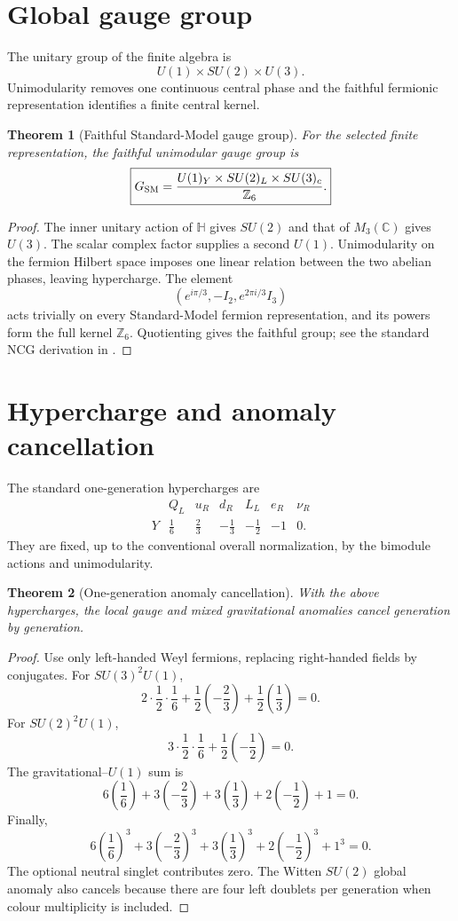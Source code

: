 \documentclass[11pt,oneside,openany]{book}
\numberwithin{equation}{chapter}
\newtheorem{theorem}{Theorem}[chapter]
\theoremstyle{definition}
\theoremstyle{remark}
\newcommand{\C}{\mathbb C}
\newcommand{\Z}{\mathbb Z}
\newcommand{\HH}{\mathbb H}
\begin{document}
\section{Global gauge group}
The unitary group of the finite algebra is
\[
 U(1)\times SU(2)\times U(3).
\]
Unimodularity removes one continuous central phase and the faithful fermionic representation identifies a finite central kernel.

\begin{theorem}[Faithful Standard-Model gauge group]
\label{thm:gauge-group}
For the selected finite representation, the faithful unimodular gauge group is
\[
 \boxed{
 G_{\rm SM}
 =\frac{U(1)_Y\times SU(2)_L\times SU(3)_c}{\Z_6}.
 }
\]
\end{theorem}

\begin{proof}
The inner unitary action of $\HH$ gives $SU(2)$ and that of $M_3(\C)$ gives $U(3)$.  The scalar complex factor supplies a second $U(1)$.  Unimodularity on the fermion Hilbert space imposes one linear relation between the two abelian phases, leaving hypercharge.  The element
\[
 \left(e^{i\pi/3},-I_2,e^{2\pi i/3}I_3\right)
\]
acts trivially on every Standard-Model fermion representation, and its powers form the full kernel $\Z_6$.  Quotienting gives the faithful group; see the standard NCG derivation in \cite{Connes1996Matter,ChamseddineConnesMarcolli2007,VanSuijlekom2015}.
\end{proof}

\section{Hypercharge and anomaly cancellation}
The standard one-generation hypercharges are
\[
\begin{array}{c|cccccc}
&Q_L&u_R&d_R&L_L&e_R&\nu_R\\
\hline
Y&\frac16&\frac23&-\frac13&-\frac12&-1&0.
\end{array}
\]
They are fixed, up to the conventional overall normalization, by the bimodule actions and unimodularity.

\begin{theorem}[One-generation anomaly cancellation]
\label{thm:anomalies}
With the above hypercharges, the local gauge and mixed gravitational anomalies cancel generation by generation.
\end{theorem}

\begin{proof}
Use only left-handed Weyl fermions, replacing right-handed fields by conjugates.  For $SU(3)^2U(1)$,
\[
 2\cdot\frac12\cdot\frac16
 +\frac12\left(-\frac23\right)
 +\frac12\left(\frac13\right)=0.
\]
For $SU(2)^2U(1)$,
\[
 3\cdot\frac12\cdot\frac16
 +\frac12\left(-\frac12\right)=0.
\]
The gravitational--$U(1)$ sum is
\[
 6\left(\frac16\right)
 +3\left(-\frac23\right)
 +3\left(\frac13\right)
 +2\left(-\frac12\right)+1=0.
\]
Finally,
\[
 6\left(\frac16\right)^3
 +3\left(-\frac23\right)^3
 +3\left(\frac13\right)^3
 +2\left(-\frac12\right)^3+1^3=0.
\]
The optional neutral singlet contributes zero.  The Witten $SU(2)$ global anomaly also cancels because there are four left doublets per generation when colour multiplicity is included.
\end{proof}
\end{document}
